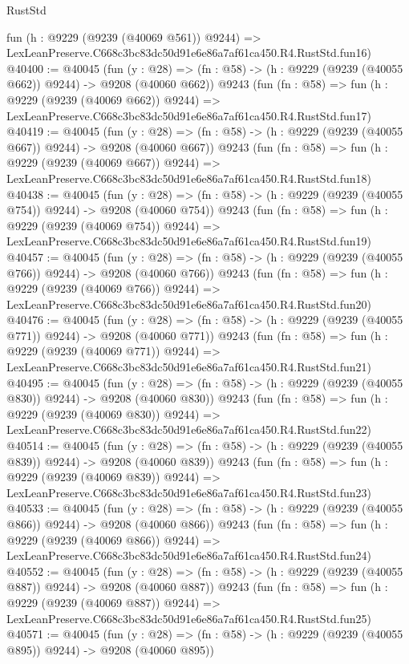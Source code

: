 \begin{lexlean}{RustStd}
\begin{coremodule}
    fun (h : @9229 (@9239 (@40069 @561)) @9244) =>
    LexLeanPreserve.C668c3bc83dc50d91e6e86a7af61ca450.R4.RustStd.fun16)
@40400 := @40045
    (fun (y : @28) => (fn : @58) -> (h : @9229 (@9239 (@40055 @662)) @9244) -> @9208 (@40060 @662))
    @9243
    (fun (fn : @58) =>
    fun (h : @9229 (@9239 (@40069 @662)) @9244) =>
    LexLeanPreserve.C668c3bc83dc50d91e6e86a7af61ca450.R4.RustStd.fun17)
@40419 := @40045
    (fun (y : @28) => (fn : @58) -> (h : @9229 (@9239 (@40055 @667)) @9244) -> @9208 (@40060 @667))
    @9243
    (fun (fn : @58) =>
    fun (h : @9229 (@9239 (@40069 @667)) @9244) =>
    LexLeanPreserve.C668c3bc83dc50d91e6e86a7af61ca450.R4.RustStd.fun18)
@40438 := @40045
    (fun (y : @28) => (fn : @58) -> (h : @9229 (@9239 (@40055 @754)) @9244) -> @9208 (@40060 @754))
    @9243
    (fun (fn : @58) =>
    fun (h : @9229 (@9239 (@40069 @754)) @9244) =>
    LexLeanPreserve.C668c3bc83dc50d91e6e86a7af61ca450.R4.RustStd.fun19)
@40457 := @40045
    (fun (y : @28) => (fn : @58) -> (h : @9229 (@9239 (@40055 @766)) @9244) -> @9208 (@40060 @766))
    @9243
    (fun (fn : @58) =>
    fun (h : @9229 (@9239 (@40069 @766)) @9244) =>
    LexLeanPreserve.C668c3bc83dc50d91e6e86a7af61ca450.R4.RustStd.fun20)
@40476 := @40045
    (fun (y : @28) => (fn : @58) -> (h : @9229 (@9239 (@40055 @771)) @9244) -> @9208 (@40060 @771))
    @9243
    (fun (fn : @58) =>
    fun (h : @9229 (@9239 (@40069 @771)) @9244) =>
    LexLeanPreserve.C668c3bc83dc50d91e6e86a7af61ca450.R4.RustStd.fun21)
@40495 := @40045
    (fun (y : @28) => (fn : @58) -> (h : @9229 (@9239 (@40055 @830)) @9244) -> @9208 (@40060 @830))
    @9243
    (fun (fn : @58) =>
    fun (h : @9229 (@9239 (@40069 @830)) @9244) =>
    LexLeanPreserve.C668c3bc83dc50d91e6e86a7af61ca450.R4.RustStd.fun22)
@40514 := @40045
    (fun (y : @28) => (fn : @58) -> (h : @9229 (@9239 (@40055 @839)) @9244) -> @9208 (@40060 @839))
    @9243
    (fun (fn : @58) =>
    fun (h : @9229 (@9239 (@40069 @839)) @9244) =>
    LexLeanPreserve.C668c3bc83dc50d91e6e86a7af61ca450.R4.RustStd.fun23)
@40533 := @40045
    (fun (y : @28) => (fn : @58) -> (h : @9229 (@9239 (@40055 @866)) @9244) -> @9208 (@40060 @866))
    @9243
    (fun (fn : @58) =>
    fun (h : @9229 (@9239 (@40069 @866)) @9244) =>
    LexLeanPreserve.C668c3bc83dc50d91e6e86a7af61ca450.R4.RustStd.fun24)
@40552 := @40045
    (fun (y : @28) => (fn : @58) -> (h : @9229 (@9239 (@40055 @887)) @9244) -> @9208 (@40060 @887))
    @9243
    (fun (fn : @58) =>
    fun (h : @9229 (@9239 (@40069 @887)) @9244) =>
    LexLeanPreserve.C668c3bc83dc50d91e6e86a7af61ca450.R4.RustStd.fun25)
@40571 := @40045
    (fun (y : @28) => (fn : @58) -> (h : @9229 (@9239 (@40055 @895)) @9244) -> @9208 (@40060 @895))

\end{coremodule}
\end{lexlean}
